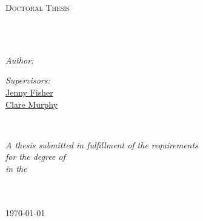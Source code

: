 
\begin{titlepage}
  \begin{center}
    
    \vspace*{.06\textheight}
    {\scshape\LARGE \univname\par}\vspace{1.5cm} %
    \textsc{\Large Doctoral Thesis}\\[0.5cm] %
    
    \HRule \\[0.4cm] %
    {\huge \bfseries \ttitle\par}\vspace{0.4cm} %
    \HRule \\[1.5cm] %
    
    \begin{minipage}[t]{0.4\textwidth}
      \begin{flushleft} \large
        \emph{Author:}\\
        \authorname %
      \end{flushleft}
    \end{minipage}
    \begin{minipage}[t]{0.4\textwidth}
      \begin{flushright} \large
        \emph{Supervisors:} \\
        \href{https://www.uow.edu.au/~jennyf/}{Jenny Fisher} \\
        \href{https://scholars.uow.edu.au/display/clare_murphy}{Clare Murphy} 
      \end{flushright}
    \end{minipage}\\[3cm]
    
    \vfill
    
    \large \textit{A thesis submitted in fulfillment of the requirements\\ for the degree of \degreename}\\[0.3cm] %
    \textit{in the}\\[0.4cm]
    \groupname\\\deptname\\[2cm] %
    
    \vfill
    
    {\large \today}\\[4cm] %
    
    \vfill
  \end{center}
\end{titlepage}

